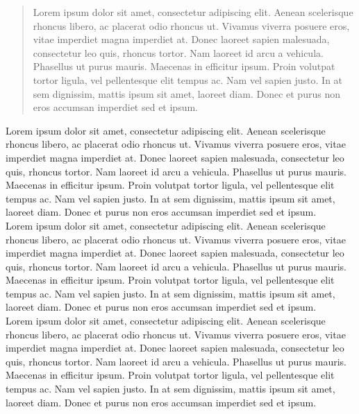 \begin{abstract}
    Lorem ipsum dolor sit amet, consectetur adipiscing elit. Aenean scelerisque rhoncus libero, ac placerat odio rhoncus ut. Vivamus viverra posuere eros, vitae imperdiet magna imperdiet at. Donec laoreet sapien malesuada, consectetur leo quis, rhoncus tortor. Nam laoreet id arcu a vehicula. Phasellus ut purus mauris. Maecenas in efficitur ipsum. Proin volutpat tortor ligula, vel pellentesque elit tempus ac. Nam vel sapien justo. In at sem dignissim, mattis ipsum sit amet, laoreet diam. Donec et purus non eros accumsan imperdiet sed et ipsum.
\end{abstract}

\begin{multicols*}{2}
Lorem ipsum dolor sit amet, consectetur adipiscing elit. Aenean scelerisque rhoncus libero, ac placerat odio rhoncus ut. Vivamus viverra posuere eros, vitae imperdiet magna imperdiet at. Donec laoreet sapien malesuada, consectetur leo quis, rhoncus tortor. Nam laoreet id arcu a vehicula. Phasellus ut purus mauris. Maecenas in efficitur ipsum. Proin volutpat tortor ligula, vel pellentesque elit tempus ac. Nam vel sapien justo. In at sem dignissim, mattis ipsum sit amet, laoreet diam. Donec et purus non eros accumsan imperdiet sed et ipsum.
\\

Lorem ipsum dolor sit amet, consectetur adipiscing elit. Aenean scelerisque rhoncus libero, ac placerat odio rhoncus ut. Vivamus viverra posuere eros, vitae imperdiet magna imperdiet at. Donec laoreet sapien malesuada, consectetur leo quis, rhoncus tortor. Nam laoreet id arcu a vehicula. Phasellus ut purus mauris. Maecenas in efficitur ipsum. Proin volutpat tortor ligula, vel pellentesque elit tempus ac. Nam vel sapien justo. In at sem dignissim, mattis ipsum sit amet, laoreet diam. Donec et purus non eros accumsan imperdiet sed et ipsum.
\\

Lorem ipsum dolor sit amet, consectetur adipiscing elit. Aenean scelerisque rhoncus libero, ac placerat odio rhoncus ut. Vivamus viverra posuere eros, vitae imperdiet magna imperdiet at. Donec laoreet sapien malesuada, consectetur leo quis, rhoncus tortor. Nam laoreet id arcu a vehicula. Phasellus ut purus mauris. Maecenas in efficitur ipsum. Proin volutpat tortor ligula, vel pellentesque elit tempus ac. Nam vel sapien justo. In at sem dignissim, mattis ipsum sit amet, laoreet diam. Donec et purus non eros accumsan imperdiet sed et ipsum.
\\
\end{multicols*}